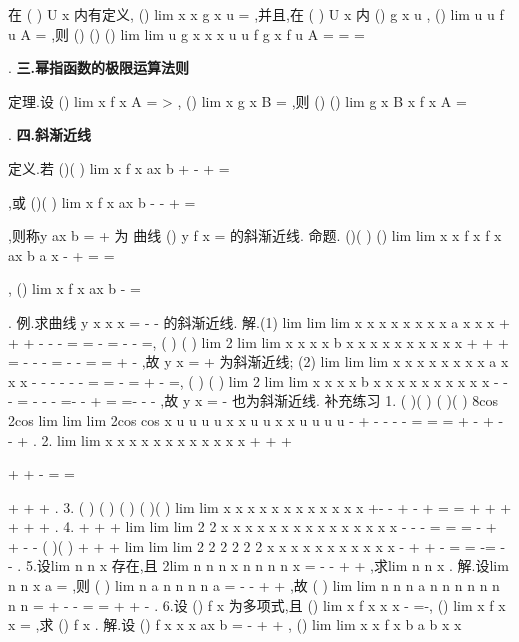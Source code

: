 在
(
)
U x
\circ 
内有定义,
()
lim
x
x g x
u
\to 
=
,并且,在
(
)
U x
\circ 
内 
()
g x
u
\neq 
,
()
lim
u
u f u
A
\to 
=
,则
()
()
()
lim
lim
u g x
x
x
u
u
f
g x
f u
A
=
\to 
\to 
=
=




. 
\vspace{4pt}
{\bfseries \textcolor{lyred}{三.幂指函数的极限运算法则}}

\textcolor{lyred}{定理}.设
()
lim
x
f x
A
\to 
=
>
\Omega 
,
()
lim
x
g x
B
\to 
=
\Omega 
,则
()
()
lim
g x
B
x
f x
A
\to 
=




\Omega 
. 
\vspace{4pt}
{\bfseries \textcolor{lyred}{四.斜渐近线}}

\textcolor{lyred}{定义}.若
()(
)
lim
x
f x
ax
b
\to +\infty 
-
+
=




,或
()(
)
lim
x
f x
ax
b
\to -\infty 
-
+
=




,则称y
ax
b
=
+
为 
曲线
()
y
f x
=
的\textcolor{lyred}{斜渐近线}. 
\textcolor{lyred}{命题}.
()(
)
()
lim
lim
x
x
f x
f x
ax
b
a
x
\to \infty 
\to \infty 
-
+
=
\Leftrightarrow 
=




,
()
lim
x
f x
ax
b
\to \infty 
-
=




. 
\textcolor{lyred}{例}.求曲线
y
x
x
x
=
-
-
的斜渐近线. 
解.(1)
lim
lim
lim
x
x
x
x
x
x
x
x
a
x
x
x
\to +\infty 
\to +\infty 
\to +\infty 
-
-
-
=
=
-
=
-
-
=, 
(
)
(
)
lim 2
lim
lim
x
x
x
x
b
x
x
x
x
x
x
x
x
x
x
\to +\infty 
\to +\infty 
\to +\infty 
=
-
-
-
=
-
-
=
=
+
-
,故 
y
x
=
+
为斜渐近线; 
(2)
lim
lim
lim
x
x
x
x
x
x
x
x
a
x
x
x
\to -\infty 
\to -\infty 
\to -\infty 
-
-
-
=
=
-
=
+
-
=, 
(
)
(
)
lim 2
lim
lim
x
x
x
x
b
x
x
x
x
x
x
x
x
x
x
\to -\infty 
\to -\infty 
\to -\infty 
=
-
-
-
=-
-
+
=
=-
-
-
,故 
y
x
=
-
也为斜渐近线. 
\textcolor{lyred}{补充练习 }
1.
(
)(
)
(
)(
)
8cos
2cos
lim
lim
lim
2cos
cos
x
u
u
u
u
x
x
u
u
x
x
u
u
u
u
\pi 
\to 
\to 
\to 
-
+
-
-
-
-
=
=
=
+
-
+
-
-
+
. 
2.
lim
lim
x
x
x
x
x
x
x
x
x
x
x
x
\to +\infty 
\to +\infty 
+


+
+
-
=
=




+
+
+
. 
3.
(
)
(
)
(
)
(
)(
)
lim
lim
x
x
x
x
x
x
x
x
x
x
x
x
\to \infty 
\to \infty 
+-
-
+
-
+
=
=
+
+
+
\cdots 
+
+
+
. 
4.
+
+
+
lim
lim
lim
2 2
x
x
x
x
x
x
x
x
x
x
x
x
x
x
x
\to 
\to 
\to 
-
-
-
=
\cdots 
\cdots 
=
=
-
+
+
-
-
(
)(
)
+
+
+
lim
lim
lim
2 2
2 2
2 2
x
x
x
x x
x
x
x
x
x
x
\to 
\to 
\to 
-
+
+
-
=
=
-=
-
-
. 
5.设lim
n
n
x
\to \infty 
存在,且
2lim
n
n
n
x
n
n
n
n
x
\to \infty 
=
-
-
+
+
,求lim
n
n
x
\to \infty 
. 
解.设lim
n
n
x
a
\to \infty 
=
,则
(
)
lim
n
a
n
n
n
n
a
\to \infty 
=
-
-
+
+
,故 
(
)
lim
lim
n
n
n
a
n
n
n
n
n
n
n
n
\to \infty 
\to \infty 
=
+
-
-
=
=
+
+
-
. 
6.设
()
f x 为多项式,且
()
lim
x
f x
x
x
\to \infty 
-
=-,
()
lim
x
f x
x
\to 
=
,求
()
f x . 
解.设
()
f x
x
x
ax
b
=
-
+
+
,
()
lim
lim
x
x
f x
b
a
b
x
x
\to 
\to 


